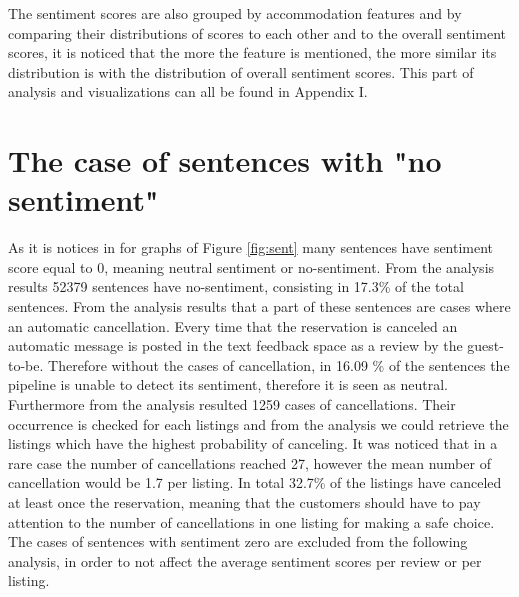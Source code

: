 The sentiment scores are also grouped by accommodation features and by comparing their distributions of scores to each other and to the overall sentiment scores, it is noticed that the more the feature is mentioned, the more similar its distribution is with the distribution of overall sentiment scores. This part of analysis and visualizations can all be found in Appendix I.
%
%
\section{The case of sentences with "no sentiment"}
As it is notices in for graphs of Figure \ref{fig:sent} many sentences have sentiment score equal to 0, meaning neutral sentiment or no-sentiment. From the analysis results 52379 sentences have no-sentiment, consisting in 17.3\% of the total sentences. From the analysis results that a part of these sentences are cases where an automatic cancellation. Every time that the reservation is canceled an automatic message is posted in the text feedback space as a review by the guest-to-be. Therefore without the cases of cancellation, in 16.09 \% of the sentences the pipeline is unable to detect its sentiment, therefore it is seen as neutral. Furthermore from the analysis resulted 1259 cases of cancellations. Their occurrence is checked for each listings and from the analysis we could retrieve the listings which have the highest probability of canceling. It was noticed that in a rare case the number of cancellations reached 27, however the mean number of cancellation would be 1.7 per listing. In total 32.7\% of the listings have canceled at least once the reservation, meaning that the customers should  have to pay attention to the number of cancellations in one listing for making a safe choice. The cases of sentences with sentiment zero are excluded from the following analysis, in order to not affect the average sentiment scores per review or per listing.

